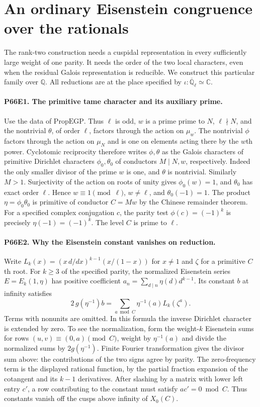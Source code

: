 \section{An ordinary Eisenstein congruence over the rationals}

The rank-two construction needs a cuspidal representation in every
sufficiently large weight of one parity. It needs the order of the two
local characters, even when the residual Galois representation is
reducible. We construct this particular family over $\mathbb Q$.
All reductions are at the place specified by
$\iota:\overline{\mathbb Q}_\ell\simeq\mathbb C$.

\paragraph{P66E1. The primitive tame character and its auxiliary prime.}
Use the data of $\mathrm{PropEGP}$. Thus $\ell$ is odd, $w$ is a
prime prime to $N$, $\ell\nmid N$, and the nontrivial $\theta$,
of order $\ell$, factors through the action on $\mu_w$.
The nontrivial $\phi$ factors through the action on $\mu_N$ and is
one on elements acting there by the $w$th power. Cyclotomic
reciprocity therefore writes $\phi,\theta$ as the Galois characters
of primitive Dirichlet characters $\phi_0,\theta_0$ of conductors
$M\mid N,w$, respectively. Indeed the only smaller divisor of the
prime $w$ is one, and $\theta$ is nontrivial. Similarly $M>1$.
Surjectivity of the action on roots of unity gives
$\phi_0(w)=1$, and $\theta_0$ has exact order $\ell$. Hence
$w\equiv1\pmod\ell$, $w\ne\ell$, and $\theta_0(-1)=1$.
The product $\eta=\phi_0\theta_0$ is primitive of conductor
$C=Mw$ by the Chinese remainder theorem. For a specified complex
conjugation $c$, the parity test $\phi(c)=(-1)^k$ is precisely
$\eta(-1)=(-1)^k$. The level $C$ is prime to $\ell$.

\paragraph{P66E2. Why the Eisenstein constant vanishes on reduction.}
Write $L_k(x)=(x\,d/dx)^{k-1}(x/(1-x))$ for $x\ne1$ and
$\zeta$ for a primitive $C$th root. For $k\ge3$ of the specified
parity, the normalized Eisenstein series $E=E_k(1,\eta)$ has
positive coefficient $a_n=\sum_{d\mid n}\eta(d)d^{k-1}$.
Its constant $b$ at infinity satisfies
\[
  2\,g(\eta^{-1})b
  =\sum_{a\bmod C}\eta^{-1}(a)L_k(\zeta^a).
\]
Terms with nonunits are omitted. In this formula the inverse Dirichlet
character is extended by zero. To see the normalization, form the
weight-$k$ Eisenstein sums for rows $(u,v)\equiv(0,a)\pmod C$,
weight by $\eta^{-1}(a)$ and divide the normalized sums by
$2g(\eta^{-1})$. Finite Fourier transformation gives the divisor
sum above: the contributions of the two signs agree by parity.
The zero-frequency term is the displayed rational function, by the
partial fraction expansion of the cotangent and its $k-1$
derivatives. After slashing by a matrix with lower left entry $c'$,
a row contributing to the constant must satisfy $a c'=0\bmod C$.
Thus constants vanish off the cusps above infinity of $X_0(C)$.

